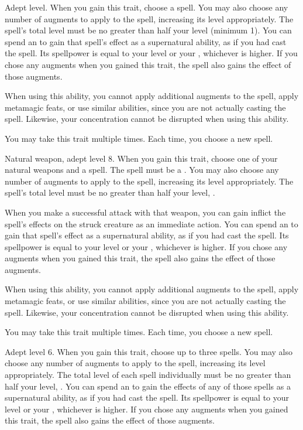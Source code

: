     \featpre Adept level.
    \featben When you gain this trait, choose a spell.
    You may also choose any number of augments to apply to the spell, increasing its level appropriately.
    The spell's total level must be no greater than half your level (minimum 1).
    You can spend an  to gain that spell's effect as a supernatural ability, as if you had cast the spell.
    Its spellpower is equal to your level or your , whichever is higher.
    If you chose any augments when you gained this trait, the spell also gains the effect of those augments.

    When using this ability, you cannot apply additional augments to the spell, apply metamagic feats, or use similar abilities, since you are not actually casting the spell.
    Likewise, your concentration cannot be disrupted when using this ability.

     You may take this trait multiple times.
    Each time, you choose a new spell.

    \featpres Natural weapon, adept level 8.
    \featben When you gain this trait, choose one of your natural weapons and a spell.
    The spell must be a .
    You may also choose any number of augments to apply to the spell, increasing its level appropriately.
    The spell's total level must be no greater than half your level, .

    When you make a successful attack with that weapon, you can gain inflict the spell's effects on the struck creature as an immediate action.
    You can spend an  to gain that spell's effect as a supernatural ability, as if you had cast the spell.
    Its spellpower is equal to your level or your , whichever is higher.
    If you chose any augments when you gained this trait, the spell also gains the effect of those augments.

    When using this ability, you cannot apply additional augments to the spell, apply metamagic feats, or use similar abilities, since you are not actually casting the spell.
    Likewise, your concentration cannot be disrupted when using this ability.

     You may take this trait multiple times.
    Each time, you choose a new spell.

    \featpre Adept level 6.
    \featben When you gain this trait, choose up to three spells.
    You may also choose any number of augments to apply to the spell, increasing its level appropriately.
    The total level of each spell individually must be no greater than half your level, .
    You can spend an  to gain the effects of any of those spells as a supernatural ability, as if you had cast the spell.
    Its spellpower is equal to your level or your , whichever is higher.
    If you chose any augments when you gained this trait, the spell also gains the effect of those augments.

